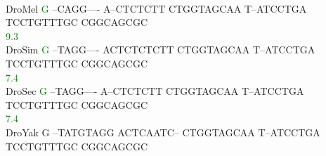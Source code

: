 \documentclass[11pt,twoside,reqno,a4paper]{article}
\begin{document}
{\\
DroMel	\textcolor{Green}{G}	--CAGG----	A--CTCTCTT	CTGGTAGCAA	T--ATCCTGA	TCCTGTTTGC	CGGCAGCGC\\
\hspace*{7\charwidth}\hspace*{0\charwidth}\textcolor{Green}{9.3}\hspace*{1\charwidth}\hspace*{1\charwidth}\hspace*{1\charwidth}\hspace*{1\charwidth}\hspace*{1\charwidth}\hspace*{1\charwidth}\\
DroSim	\textcolor{Green}{G}	--TAGG----	ACTCTCTCTT	CTGGTAGCAA	T--ATCCTGA	TCCTGTTTGC	CGGCAGCGC\\
\hspace*{7\charwidth}\hspace*{0\charwidth}\textcolor{Green}{7.4}\hspace*{1\charwidth}\hspace*{1\charwidth}\hspace*{1\charwidth}\hspace*{1\charwidth}\hspace*{1\charwidth}\hspace*{1\charwidth}\\
DroSec	\textcolor{Green}{G}	--TAGG----	A--CTCTCTT	CTGGTAGCAA	T--ATCCTGA	TCCTGTTTGC	CGGCAGCGC\\
\hspace*{7\charwidth}\hspace*{0\charwidth}\textcolor{Green}{7.4}\hspace*{1\charwidth}\hspace*{1\charwidth}\hspace*{1\charwidth}\hspace*{1\charwidth}\hspace*{1\charwidth}\hspace*{1\charwidth}\\
DroYak	G	--TATGTAGG	ACTCAATC--	CTGGTAGCAA	T--ATCCTGA	TCCTGTTTGC	CGGCAGCGC\\
\hspace*{7\charwidth}\hspace*{1\charwidth}\hspace*{1\charwidth}\hspace*{1\charwidth}\hspace*{1\charwidth}\hspace*{1\charwidth}\hspace*{1\charwidth}\\
}
\end{document}
